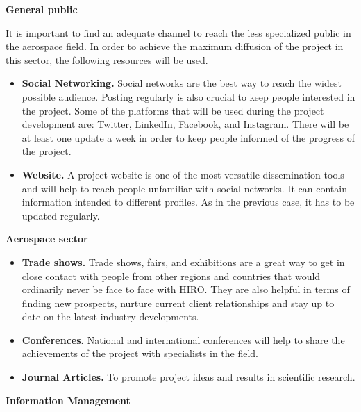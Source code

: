 \textbf{General public}

It is important to find an adequate channel to reach the less specialized public in the aerospace field. In order to achieve the maximum diffusion of the project in this sector,  the following resources will be used.

\begin{itemize}
	\item{\textbf{Social Networking.} Social networks are the best way to reach the widest possible audience. Posting regularly is also crucial to keep people interested in the project. Some of the platforms that will be used during the project development are: Twitter, LinkedIn, Facebook, and Instagram. There will be at least one update a week in order to keep people informed of the progress of the project.}
	\item{\textbf{Website.} A project website is one of the most versatile dissemination tools and will help to reach people unfamiliar with social networks. It can contain information intended to different profiles. As in the previous case, it has to be updated regularly.}
\end{itemize}

\textbf{Aerospace sector}

\begin{itemize}
	\item{\textbf{Trade shows.} Trade shows, fairs, and exhibitions are a great way to get in close contact with people from other regions and countries that would ordinarily never be face to face with HIRO. They are also helpful in terms of finding new prospects, nurture current client relationships and stay up to date on the latest industry developments.}
	\item{\textbf{Conferences.} National and international conferences will help to share the achievements of the project with specialists in the field.}
	\item {\textbf{Journal Articles.} To promote project ideas and results in scientific research.}
\end{itemize}

\textbf{Information Management}

